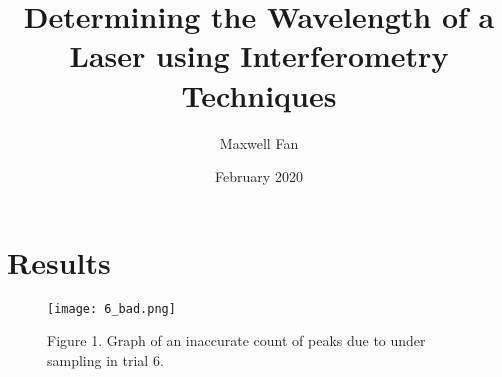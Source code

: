 \documentclass{article}
\title{Determining the Wavelength of a Laser using Interferometry Techniques}
\author{Maxwell Fan}
\date{February 2020}
\begin{document}
\maketitle

\section*{Results}

\begin{figure}[!ht]
\begingroup
    \rightskip
    \leftskip
    \begin{center}
        \texttt{[image: 6\_bad.png]}
        \caption*{Figure 1. Graph of an inaccurate count of peaks due to under sampling in trial 6.}
    \end{center}
\endgroup
\end{figure}
\end{document}
